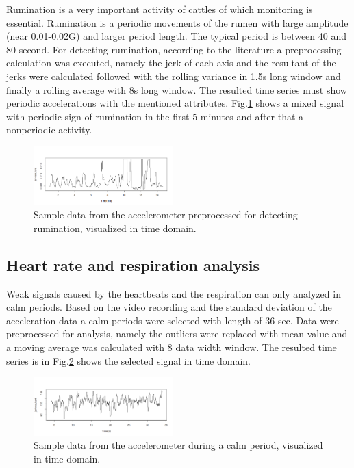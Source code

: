 \documentclass[conference]{IEEEtran}
\begin{document}
Rumination is a very important activity of cattles of which monitoring is
essential. Rumination is a periodic movements of the rumen with large amplitude
(near 0.01-0.02G) and larger period length. The typical period is between 40
and 80 second. For detecting rumination, according to the literature a
preprocessing calculation was executed, namely the jerk of each axis and the
resultant of the jerks were calculated followed with the rolling variance in
1.5s long window and finally a rolling average with 8s long window. The
resulted time series must show periodic accelerations with the mentioned
attributes. Fig.\ref{rumination} shows a mixed signal with periodic sign of
rumination in the first 5 minutes and after that a nonperiodic activity.

\begin{figure}[htbp]
\centerline{\includegraphics[width=0.48\textwidth]{fig/rumination.png}}
  \caption{Sample data from the accelerometer preprocessed for detecting
  rumination, visualized in time domain.}
\label{rumination}
\end{figure}

\subsection{Heart rate and respiration analysis}

Weak signals caused by the heartbeats and the respiration can only analyzed in
calm periods. Based on the video recording and the standard deviation of the
acceleration data a calm periods were selected with length of 36 sec. Data were
preprocessed for analysis, namely the outliers were replaced with mean value
and a moving average was calculated with 8 data width window. The resulted time
series is in Fig.\ref{heart-time-domain}  shows the selected signal in time
domain.

\begin{figure}[htbp]
\centerline{\includegraphics[width=0.48\textwidth]{fig/ts_heart.png}}
  \caption{Sample data from the accelerometer during a calm period, visualized
  in time domain.}
\label{heart-time-domain}
\end{figure}
\end{document}
